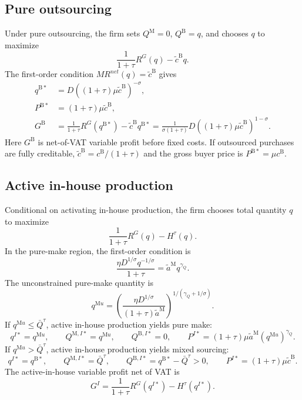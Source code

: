 \documentclass[11pt,a4paper]{article}
\newcommand{\M}{\mathrm{M}}
\newcommand{\B}{\mathrm{B}}
\begin{document}
\subsection{Pure outsourcing}

Under pure outsourcing, the firm sets $Q^{\M}=0$, $Q^{\B}=q$, and chooses $q$ to maximize
\begin{equation}
    \frac{1}{1+\tau}R^G(q)-\widetilde c^{\B}q.
\end{equation}
The first-order condition $MR^{net}(q)=\widetilde c^{\B}$ gives
\begin{align}
    q^{\B *}&=D\left((1+\tau)\mu\widetilde c^{\B}\right)^{-\sigma},
    \label{eq:qB_star}\\
    P^{\B *}&=(1+\tau)\mu\widetilde c^{\B},
    \label{eq:pB_star}\\
    G^{\B}&=\frac{1}{1+\tau}R^G(q^{\B *})-\widetilde c^{\B}q^{\B *}
    =\frac{1}{\sigma(1+\tau)}D\left((1+\tau)\mu\widetilde c^{\B}\right)^{1-\sigma}.
    \label{eq:GB}
\end{align}
Here $G^{\B}$ is net-of-VAT variable profit before fixed costs. If outsourced purchases are fully creditable, $\widetilde c^{\B}=c^{\B}/(1+\tau)$ and the gross buyer price is $P^{\B *}=\mu c^{\B}$.

\subsection{Active in-house production}

Conditional on activating in-house production, the firm chooses total quantity $q$ to maximize
\begin{equation}
    \frac{1}{1+\tau}R^G(q)-H^{\tau}(q).
\end{equation}
In the pure-make region, the first-order condition is
\begin{equation}
    \frac{\eta D^{1/\sigma}q^{-1/\sigma}}{1+\tau}=\widetilde a^{\M}q^{\gamma_Q}.
\end{equation}
The unconstrained pure-make quantity is
\begin{equation}
    q^{\M u}
    =\left(\frac{\eta D^{1/\sigma}}{(1+\tau)\widetilde a^{\M}}\right)^{1/(\gamma_Q+1/\sigma)}.
    \label{eq:qMu}
\end{equation}
If $q^{\M u}\leq\bar Q^{\tau}$, active in-house production yields pure make:
\begin{equation}
    q^{I*}=q^{\M u},
    \qquad
    Q^{\M,I*}=q^{\M u},
    \qquad
    Q^{\B,I*}=0,
    \qquad
    P^{I*}=(1+\tau)\mu\widetilde a^{\M}(q^{\M u})^{\gamma_Q}.
    \label{eq:pure_make_solution}
\end{equation}
If $q^{\M u}>\bar Q^{\tau}$, active in-house production yields mixed sourcing:
\begin{equation}
    q^{I*}=q^{\B *},
    \qquad
    Q^{\M,I*}=\bar Q^{\tau},
    \qquad
    Q^{\B,I*}=q^{\B *}-\bar Q^{\tau}>0,
    \qquad
    P^{I*}=(1+\tau)\mu\widetilde c^{\B}.
    \label{eq:mix_solution}
\end{equation}
The active-in-house variable profit net of VAT is
\begin{equation}
    G^{I}=\frac{1}{1+\tau}R^G(q^{I*})-H^{\tau}(q^{I*}).
    \label{eq:GI}
\end{equation}
\end{document}
